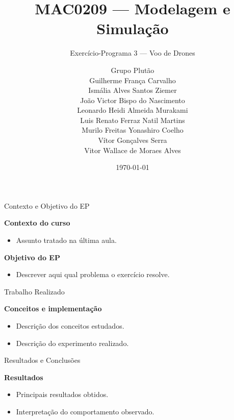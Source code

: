 \documentclass[aspectratio=169]{beamer}
\title{MAC0209 --- Modelagem e Simulação}
\subtitle{Exercício-Programa 3 --- Voo de Drones}
\author[Grupo Plutão]{Grupo Plutão \\[4pt]
Guilherme França Carvalho \\
Ismália Alves Santos Ziemer \\
João Victor Bispo do Nascimento \\
Leonardo Heidi Almeida Murakami \\
Luis Renato Ferraz Natil Martins \\
Murilo Freitas Yonashiro Coelho \\
Vítor Gonçalves Serra \\
Vitor Wallace de Moraes Alves }
\institute[BCC IME-USP]{Bacharelado em Ciência da Computação \\ IME -- USP}
\date{\today}
\begin{document}
\begin{frame}
\titlepage
\end{frame}

\begin{frame}{Contexto e Objetivo do EP}

\textbf{Contexto do curso}

\begin{itemize}
    \item Assunto tratado na última aula.
\end{itemize}

\vspace{0.5cm}

\textbf{Objetivo do EP}

\begin{itemize}
    \item Descrever aqui qual problema o exercício resolve.
\end{itemize}

\end{frame}

\begin{frame}{Trabalho Realizado}

\textbf{Conceitos e implementação}

\begin{itemize}
    \item Descrição dos conceitos estudados.
    \item Descrição do experimento realizado.
\end{itemize}

\end{frame}

\begin{frame}{Resultados e Conclusões}

\textbf{Resultados}

\begin{itemize}
    \item Principais resultados obtidos.
    \item Interpretação do comportamento observado.
\end{itemize}

\end{frame}
\end{document}
